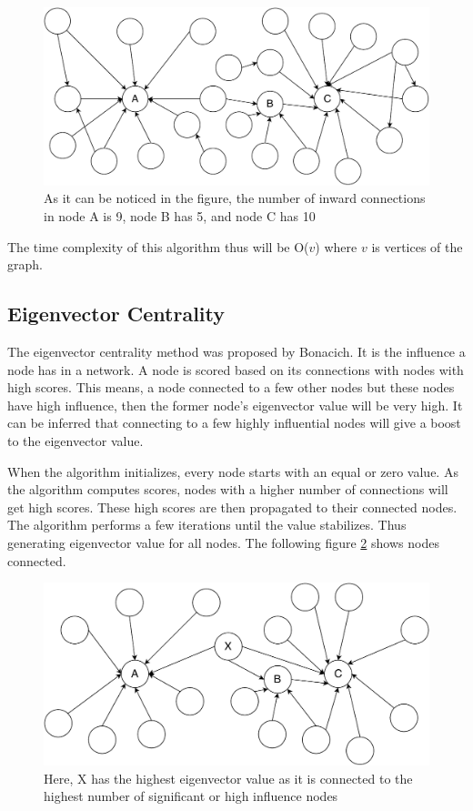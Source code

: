 \documentclass[journal,twoside,web]{ieeecolor}
\begin{document}
\begin{figure}[!h]
    \centerline{\includegraphics[scale=0.45]{figures/degree_centrality.pdf}}
    \caption{As it can be noticed in the figure, the number of inward connections in node A is 9, node B has 5, and node C has 10}
    \label{fig10}
\end{figure}

The time complexity of this algorithm thus will be O($v$) where $v$ is vertices of the graph.

\subsection{Eigenvector Centrality}
The eigenvector centrality method was proposed by Bonacich\cite{26}. It is the influence a node has in a network. A node is scored based on its connections with nodes with high scores. This means, a node connected to a few other nodes but these nodes have high influence, then the former node's eigenvector value will be very high. It can be inferred that connecting to a few highly influential nodes will give a boost to the eigenvector value.

When the algorithm initializes, every node starts with an equal or zero value. As the algorithm computes scores, nodes with a higher number of connections will get high scores. These high scores are then propagated to their connected nodes. The algorithm performs a few iterations until the value stabilizes. Thus generating eigenvector value for all nodes. The following figure \ref{fig11} shows nodes connected.

\begin{figure}[!h]
    \centerline{\includegraphics[scale=0.45]{figures/eigenvector_centrality.pdf}}
    \caption{Here, X has the highest eigenvector value as it is connected to the highest number of significant or high influence nodes}
    \label{fig11}
\end{figure}
\end{document}
